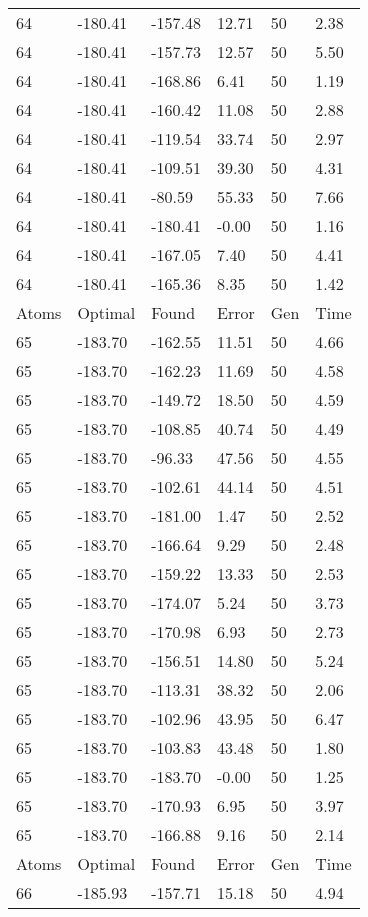 \documentclass{report}
\begin{document}
\begin{appendix}
\begin{longtable}{llllll}
64 & -180.41 & -157.48 & 12.71 & 50 & 2.38 \\
64 & -180.41 & -157.73 & 12.57 & 50 & 5.50 \\
64 & -180.41 & -168.86 & 6.41 & 50 & 1.19 \\
64 & -180.41 & -160.42 & 11.08 & 50 & 2.88 \\
64 & -180.41 & -119.54 & 33.74 & 50 & 2.97 \\
64 & -180.41 & -109.51 & 39.30 & 50 & 4.31 \\
64 & -180.41 & -80.59 & 55.33 & 50 & 7.66 \\
64 & -180.41 & -180.41 & -0.00 & 50 & 1.16 \\
64 & -180.41 & -167.05 & 7.40 & 50 & 4.41 \\
64 & -180.41 & -165.36 & 8.35 & 50 & 1.42 \\
Atoms & Optimal & Found & Error & Gen & Time \\
65 & -183.70 & -162.55 & 11.51 & 50 & 4.66 \\
65 & -183.70 & -162.23 & 11.69 & 50 & 4.58 \\
65 & -183.70 & -149.72 & 18.50 & 50 & 4.59 \\
65 & -183.70 & -108.85 & 40.74 & 50 & 4.49 \\
65 & -183.70 & -96.33 & 47.56 & 50 & 4.55 \\
65 & -183.70 & -102.61 & 44.14 & 50 & 4.51 \\
65 & -183.70 & -181.00 & 1.47 & 50 & 2.52 \\
65 & -183.70 & -166.64 & 9.29 & 50 & 2.48 \\
65 & -183.70 & -159.22 & 13.33 & 50 & 2.53 \\
65 & -183.70 & -174.07 & 5.24 & 50 & 3.73 \\
65 & -183.70 & -170.98 & 6.93 & 50 & 2.73 \\
65 & -183.70 & -156.51 & 14.80 & 50 & 5.24 \\
65 & -183.70 & -113.31 & 38.32 & 50 & 2.06 \\
65 & -183.70 & -102.96 & 43.95 & 50 & 6.47 \\
65 & -183.70 & -103.83 & 43.48 & 50 & 1.80 \\
65 & -183.70 & -183.70 & -0.00 & 50 & 1.25 \\
65 & -183.70 & -170.93 & 6.95 & 50 & 3.97 \\
65 & -183.70 & -166.88 & 9.16 & 50 & 2.14 \\
Atoms & Optimal & Found & Error & Gen & Time \\
66 & -185.93 & -157.71 & 15.18 & 50 & 4.94 \\

\end{longtable}
\end{appendix}
\end{document}
